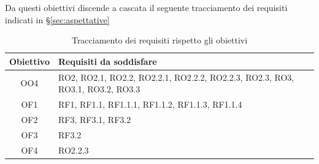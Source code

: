 Da questi obiettivi discende a cascata il seguente tracciamento dei requisiti indicati in \S\ref{sec:aspettative}
\begin{table}[H]
    \centering
    \begin{tabular}{|c|m{}|}
    \hline
        \textbf{Obiettivo} & \textbf{Requisiti da soddisfare} \\ \hline
        OO4 & RO2, RO2.1, RO2.2, RO2.2.1, RO2.2.2, RO2.2.3, RO2.3, RO3, RO3.1, RO3.2, RO3.3 \\ \hline
        OF1 & RF1, RF1.1, RF1.1.1, RF1.1.2, RF1.1.3, RF1.1.4 \\ \hline
        OF2 & RF3, RF3.1, RF3.2 \\ \hline
        OF3 & RF3.2 \\ \hline
        OF4 & RO2.2.3 \\ \hline
    \end{tabular}
    \caption{Tracciamento dei requisiti rispetto gli obiettivi}
    \label{tab:tracciamento}
\end{table}
\newpage
